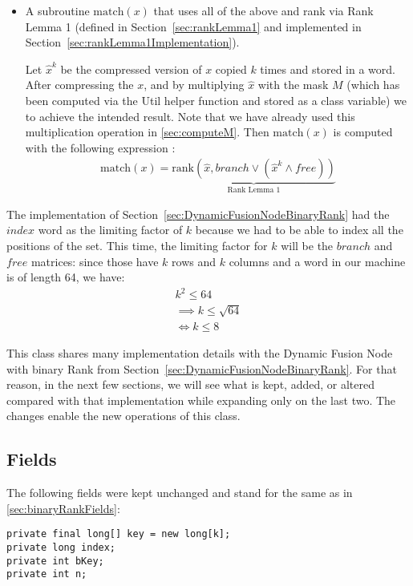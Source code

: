 \begin{itemize}
    \item
    A subroutine $\text{match}(x)$ that uses all of the above and rank via Rank Lemma 1 (defined in Section~\ref{sec:rankLemma1} and implemented in Section~\ref{sec:rankLemma1Implementation}).
    
    Let $\hat x^k$ be the compressed version of $x$ copied $k$ times and stored in a word. After compressing the $x$, and by multiplying $\hat x$ with the mask $M$ (which has been computed via the {\ttfamily Util} helper function and stored as a class variable) we to achieve the intended result. Note that we have already used this multiplication operation in \ref{sec:computeM}.
    Then $\text{match}(x)$ is computed with the following expression \cite{patrascu2014dynamic}:
    \begin{align*}
        \text{match}(x) = \underbrace{\text{rank}(\hat x, branch \vee (\hat x^k \wedge free))}_{\text{Rank Lemma 1}}
    \end{align*}
\end{itemize}

The implementation of Section~\ref{sec:DynamicFusionNodeBinaryRank} had the $index$ word as the limiting factor of $k$ because we had to be able to index all the positions of the set. This time, the limiting factor for $k$ will be the $branch$ and $free$ matrices: since those have $k$ rows and $k$ columns and a word in our machine is of length 64, we have:
\begin{align*}
    k^2 \leq 64\\
    \implies k \leq \sqrt{64}\\
    \iff k \leq 8
\end{align*}

This class shares many implementation details with the Dynamic Fusion Node with binary Rank from Section~\ref{sec:DynamicFusionNodeBinaryRank}. For that reason, in the next few sections, we will see what is kept, added, or altered compared with that implementation while expanding only on the last two. The changes enable the new operations of this class.

\subsection{Fields} \label{sec:dontCaresRankFields}
The following fields were kept unchanged and stand for the same as in \ref{sec:binaryRankFields}:
\begin{lstlisting}
private final long[] key = new long[k];
private long index;
private int bKey;
private int n;
\end{lstlisting}

